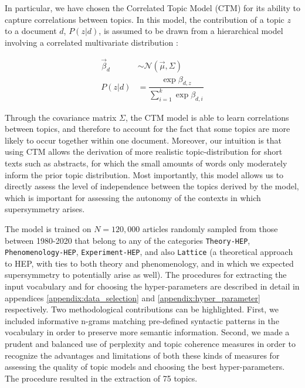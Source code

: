 \documentclass[smallextended]{svjour3}
\begin{document}
In particular, we have chosen the Correlated Topic Model (CTM) for its ability to capture correlations between topics. In this model, the contribution of a topic $z$ to a document $d$, $P(z|d)$, is assumed to be drawn from a hierarchical model involving a correlated multivariate distribution \citep{Blei2007}:%

\begin{align}
    \label{eq:ctm_prior}
    \vec{\beta}_{d} &\sim \mathcal{N}(\vec{\mu}, \Sigma) \\
    P(z|d) &= \dfrac{\exp \beta_{d,z}}{\sum_{i=1}^k \exp \beta_{d,i}}
\end{align}

Through the covariance matrix $\Sigma$, the CTM model is able to learn correlations between topics, and therefore to account for the fact that some topics are more likely to occur together within one document. Moreover, our intuition is that using CTM allows the derivation of more realistic topic-distribution for short texts such as abstracts, for which the small amounts of words only moderately inform the prior topic distribution. Most importantly, this model allows us to directly assess the level of independence between the topics derived by the model, which is important for assessing the autonomy of the contexts in which supersymmetry arises.

The model is trained on $N=120,000$ articles randomly sampled from those between 1980-2020 that belong to any of the categories \texttt{Theory-HEP}, \texttt{Phenomenology-HEP}, \texttt{Experiment-HEP}, and also \texttt{Lattice} (a theoretical approach to HEP, with ties to both theory and phenomenology, and in which we expected supersymmetry to potentially arise as well). The procedures for extracting the input vocabulary and for choosing the hyper-parameters are described in detail in appendices \ref{appendix:data_selection} and \ref{appendix:hyper_parameter} respectively. Two methodological contributions can be highlighted. First, we included informative n-grams matching pre-defined syntactic patterns in the vocabulary in order to preserve more semantic information. Second, we made a prudent and balanced use of perplexity and topic coherence measures in order to recognize the advantages and limitations of both these kinds of measures for assessing the quality of topic models and choosing the best hyper-parameters. The procedure resulted in the extraction of 75 topics.
\end{document}
